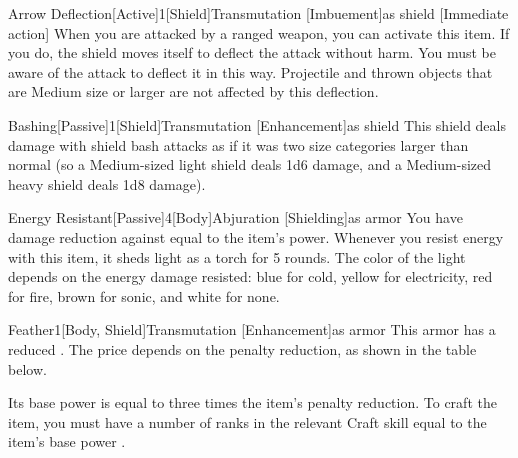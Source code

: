         \begin{magicitemdef}{Arrow Deflection}[Active]{1}[Shield]{Transmutation [Imbuement]}{as shield}
            [Immediate action] When you are attacked by a ranged weapon, you can activate this item.
            If you do, the shield moves itself to deflect the attack without harm.
            You must be aware of the attack to deflect it in this way.
            Projectile and thrown objects that are Medium size or larger are not affected by this deflection.
        \end{magicitemdef}

        \begin{magicitemdef}{Bashing}[Passive]{1}[Shield]{Transmutation [Enhancement]}{as shield}
             This shield deals damage with shield bash attacks as if it was two size categories larger than normal (so a Medium-sized light shield deals 1d6 damage, and a Medium-sized heavy shield deals 1d8 damage).
        \end{magicitemdef}

        \begin{magicitemdef}{Energy Resistant}[Passive]{4}[Body]{Abjuration [Shielding]}{as armor}
             You have damage reduction against  equal to the item's power.
            Whenever you resist energy with this item, it sheds light as a torch for 5 rounds.
            The color of the light depends on the energy damage resisted: blue for cold, yellow for electricity, red for fire, brown for sonic, and white for none.
        \end{magicitemdef}

        \begin{magicitemdef}{Feather}{1}[Body, Shield]{Transmutation [Enhancement]}{as armor}
             This armor has a reduced .
            The price depends on the penalty reduction, as shown in the table below.

            Its base power is equal to three times the item's penalty reduction.
            To craft the item, you must have a number of ranks in the relevant Craft skill equal to the item's base power .
        \end{magicitemdef}

